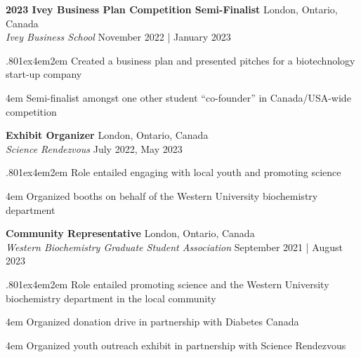 \documentclass[a4paper,9pt]{extarticle}
\begin{document}
\noindent
\begin{minipage}{1\textwidth}
\setlength{\parindent}{15pt} %
	\noindent
	\textbf{2023 Ivey Business Plan Competition Semi-Finalist} \hfill London, Ontario, Canada\\ %
	\textit{Ivey Business School} \hfill November 2022 | January 2023  \par%
	{\hsize.80\linewidth\parskip1ex\hangindent4em\parindent2em 
	\setlength{\parskip}{0pt} %
		\indent Created a business plan and presented pitches for a biotechnology start-up company \par
		\hangindent4em
		\indent Semi-finalist amongst one other student “co-founder” in Canada/USA-wide competition \par}
\end{minipage}
\vspace{\parskip}

\noindent
\begin{minipage}{1\textwidth}
\setlength{\parindent}{15pt} %
	\noindent
	\textbf{Exhibit Organizer} \hfill London, Ontario, Canada\\ %
	\textit{Science Rendezvous} \hfill July 2022, May 2023  \par%
	{\hsize.80\linewidth\parskip1ex\hangindent4em\parindent2em 
	\setlength{\parskip}{0pt} %
		\indent Role entailed engaging with local youth and promoting science  \par
		\hangindent4em
		\indent Organized booths on behalf of the Western University biochemistry department \par}
\end{minipage}
\vspace{\parskip}

\noindent
\begin{minipage}{1\textwidth}
\setlength{\parindent}{15pt} %
	\noindent
	\textbf{Community Representative} \hfill London, Ontario, Canada\\ %
	\textit{Western Biochemistry Graduate Student Association} \hfill September 2021 | August 2023  \par%
	{\hsize.80\linewidth\parskip1ex\hangindent4em\parindent2em 
	\setlength{\parskip}{0pt} %
		\indent Role entailed promoting science and the Western University biochemistry department in the local community \par
		\hangindent4em
		\indent Organized donation drive in partnership with Diabetes Canada \par
		\hangindent4em
		\indent Organized youth outreach exhibit in partnership with Science Rendezvous \par}
\end{minipage}
\vspace{\parskip}
\end{document}

